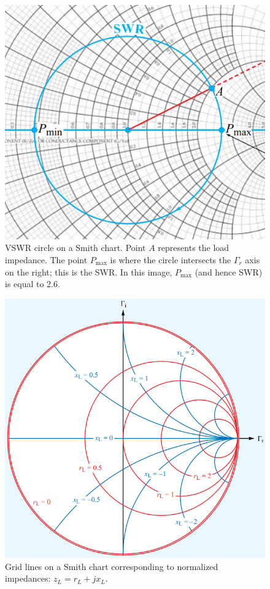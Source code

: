 \begin{figure}[!htp]
    \centering
    \includegraphics[width=0.5\linewidth]{images/Transmission Line Theory/SmithChart_VSWRCircle.png}
    \caption{VSWR circle on a Smith chart. Point $A$ represents the load impedance. The point $P_\text{max}$ is where the circle intersects the $\Gamma_r$ axis on the right; this is the SWR. In this image, $P_\text{max}$ (and hence SWR) is equal to 2.6.}
    \label{fig:SmithChart_VSWRCircle}
\end{figure}

\begin{figure}[!htp]
    \centering
    \includegraphics[width=0.5\linewidth]{images/Transmission Line Theory/SmithChart_RLXLCircles.png}
    \caption{Grid lines on a Smith chart corresponding to normalized impedances: $z_L = r_L + j x_L$. }
    \label{fig:SmithChart_RLXLCircles}
\end{figure}

